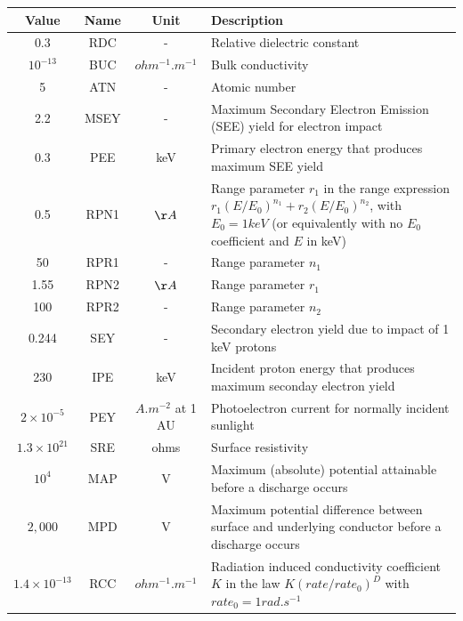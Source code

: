 \documentclass[a4paper, 11pt]{article}
\begin{document}
\begin{center}
\begin{tabular}{|c|c|c|p{9cm}|}
    \hline
    \textbf{Value} & \textbf{Name} & \textbf{Unit} & \textbf{Description} \\
    \hline
    0.3 & RDC & - & Relative dielectric constant \\
    \hline
    $10^{-13}$ & BUC & $\si{ohm^{-1}.m^{-1}}$ & Bulk conductivity\\
    \hline
    5 & ATN & - & Atomic number \\ 
    \hline
    2.2 & MSEY & - & Maximum Secondary Electron Emission (SEE) yield for electron impact \\
    \hline
    0.3 & PEE & keV & Primary electron energy that produces maximum SEE yield \\ 
    \hline
    0.5 & RPN1 & $\AA$ & Range parameter $r_1$ in the range expression $r_1(E/E_0)^{n_1}+r_2(E/E_0)^{n_2}$, with $E_0=1 \si{keV}$ (or equivalently with no $E_0$ coefficient and $E$ in keV) \\ 
    \hline
    50 & RPR1 & - & Range parameter $n_1$ \\ 
    \hline
    1.55 & RPN2 & $\AA$ & Range parameter $r_1$ \\ 
    \hline
    100 & RPR2 & - & Range parameter $n_2$ \\ 
    \hline
    0.244 & SEY & - & Secondary electron yield due to impact of 1 keV protons \\ 
    \hline
    230 & IPE & keV & Incident proton energy that produces maximum seconday electron yield \\ 
    \hline
    $2 \times 10^{-5}$ & PEY & $A.m^{-2}$ at 1 AU & Photoelectron current for normally incident sunlight \\ 
    \hline
    $1.3 \times 10^{21}$ & SRE & ohms & Surface resistivity \\ 
    \hline
    $10^4$ & MAP & V & Maximum (absolute) potential attainable before a discharge occurs \\ 
    \hline
    $2,000$ & MPD & V & Maximum potential difference between surface and underlying conductor before a discharge occurs \\ 
    \hline
    $1.4 \times 10^{-13}$ & RCC & $\si{ohm^{-1}.m^{-1}}$ & Radiation induced conductivity coefficient $K$ in the law $K(rate/rate_0)^D$ with $rate_0=1 \si{rad.s^{-1}}$ \\ 
    \hline
\end{tabular}
\end{center}
\end{document}

